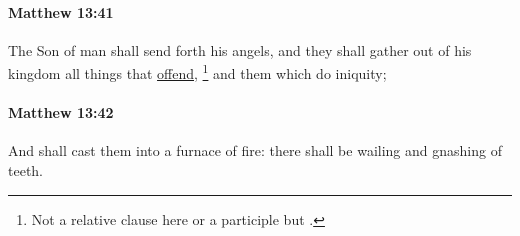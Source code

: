 		\paragraph{Matthew 13:41} %
			\label{MATTHEW-13-41}

			The Son of man shall send forth his angels, and they shall gather out of his kingdom all things that \hyperref[OFFENSE]{offend},%
				\footnote{%
					Not a relative clause here or a participle but .
					}
			and them which do iniquity;

			\begin{framed}
			\scriptsize
				\begin{compactdesc}
					\item[SBLG]  \hyperref[ANOMIA]{}\gr{,}
				\end{compactdesc}
			\end{framed}

		\paragraph{Matthew 13:42} %
			\label{MATTHEW-13-42}

			And shall cast them into a furnace of fire: there shall be wailing and gnashing of teeth.

